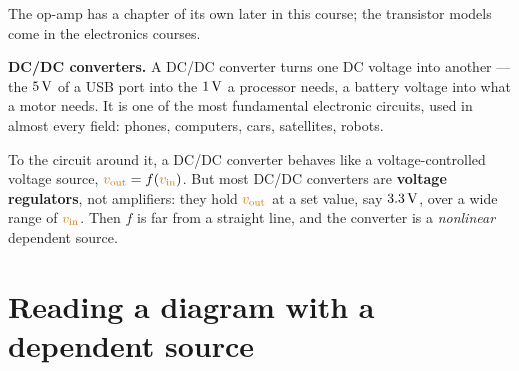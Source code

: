 \documentclass[11pt,a4paper]{article}
\newcommand{\Vcol}[1]{\textcolor{cvolt}{#1}}
\begin{document}
The op-amp has a chapter of its own later in this course; the transistor models come in the
electronics courses.

\textbf{DC/DC converters.} A DC/DC converter turns one DC voltage into another --- the
$5\,\mathrm{V}$ of a USB port into the $1\,\mathrm{V}$ a processor needs, a battery voltage into what a motor
needs. It is one of the most fundamental electronic circuits, used in almost every field:
phones, computers, cars, satellites, robots.

\begin{minipage}[c]{0.58\linewidth}
To the circuit around it, a DC/DC converter behaves like a voltage-controlled voltage
source, $\Vcol{v_{\mathrm{out}}} = f(\Vcol{v_{\mathrm{in}}})$. But most DC/DC converters are
\textbf{voltage regulators}, not amplifiers: they hold $\Vcol{v_{\mathrm{out}}}$ at a set
value, say $3.3\,\mathrm{V}$, over a wide range of $\Vcol{v_{\mathrm{in}}}$. Then $f$ is far from a
straight line, and the converter is a \emph{nonlinear} dependent source.
\end{minipage}\hfill
\begin{minipage}[c]{0.38\linewidth}
\centering
{}
\end{minipage}

\section{Reading a diagram with a dependent source}
\end{document}
